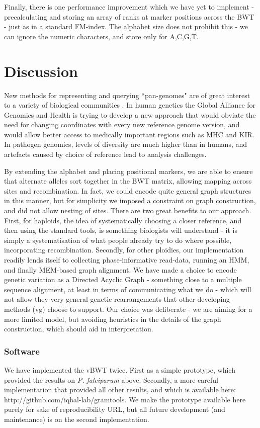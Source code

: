 \documentclass[runningheads,a4paper]{llncs}
\begin{document}
Finally, there is one performance improvement which we have yet to implement - precalculating and storing an array of ranks at marker positions across the BWT - just as in a standard FM-index. The alphabet size does not prohibit this - we can ignore the numeric characters, and store only for A,C,G,T. 

\section{Discussion}
New methods for representing and querying ``pan-genomes" are of great interest to a variety of biological communities \cite{marschall}. In human genetics the Global Alliance for Genomics and Health is trying to develop a new approach that would obviate the need for changing coordinates with every new reference genome version, and would allow better access to medically important regions such as MHC and KIR. In pathogen genomics, levels of diversity are much higher than in humans, and artefacts caused by choice of reference lead to analysis challenges.

By extending the alphabet and placing positional markers, we are able to ensure that alternate alleles sort together in the BWT matrix, allowing mapping across sites and recombination. In fact, we could encode quite general graph structures in this manner, but for simplicity we imposed a constraint on graph construction, and did not allow nesting of sites. There are two great benefits to our approach. First, for haploids, the idea of systematically choosing a closer reference, and then using the standard tools, is something biologists will understand - it is simply a systematisation of what people already try to do where possible, incorporating recombination. Secondly, for other ploidies, our implementation readily lends itself to collecting phase-informative read-data, running an HMM, and finally MEM-based graph alignment. We have made a choice to encode genetic variation as a Directed Acyclic Graph - something close to a multiple sequence alignment, at least in terms of communicating what we do - which will not allow they very general genetic rearrangements that other developing methods (vg) choose to support. Our choice was deliberate - we are aiming for a more limited model, but avoiding heuristics in the details of the graph construction, which should aid in interpretation. 






\subsubsection{Software}
We have implemented the vBWT twice. First as a simple prototype, which provided the results on \textit{P. falciparum} above. Secondly,  a more careful implementation that provided all other results, and which is available here: http://github.com/iqbal-lab/gramtools. We make the prototype available here purely for sake of reproducibility URL, but all future development (and maintenance) is on the second implementation.
\end{document}
